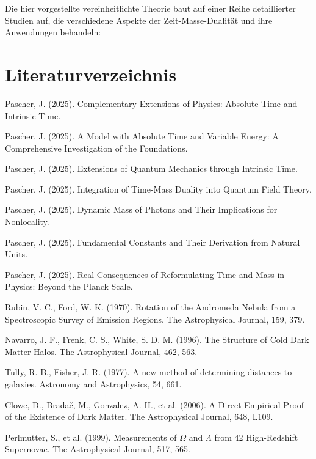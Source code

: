 \documentclass{article}
\begin{document}
	Die hier vorgestellte vereinheitlichte Theorie baut auf einer Reihe detaillierter Studien auf, die verschiedene Aspekte der Zeit-Masse-Dualität und ihre Anwendungen behandeln:
	
	\section{Literaturverzeichnis}
	
	\begin{thebibliography}{99}
		
		 Pascher, J. (2025). Complementary Extensions of Physics: Absolute Time and Intrinsic Time.
		
		 Pascher, J. (2025). A Model with Absolute Time and Variable Energy: A Comprehensive Investigation of the Foundations.
		
		 Pascher, J. (2025). Extensions of Quantum Mechanics through Intrinsic Time.
		
		 Pascher, J. (2025). Integration of Time-Mass Duality into Quantum Field Theory.
		
		 Pascher, J. (2025). Dynamic Mass of Photons and Their Implications for Nonlocality.
		
		 Pascher, J. (2025). Fundamental Constants and Their Derivation from Natural Units.
		
		 Pascher, J. (2025). Real Consequences of Reformulating Time and Mass in Physics: Beyond the Planck Scale.
		
		 Rubin, V. C., Ford, W. K. (1970). Rotation of the Andromeda Nebula from a Spectroscopic Survey of Emission Regions. The Astrophysical Journal, 159, 379.
		
		 Navarro, J. F., Frenk, C. S., White, S. D. M. (1996). The Structure of Cold Dark Matter Halos. The Astrophysical Journal, 462, 563.
		
		 Tully, R. B., Fisher, J. R. (1977). A new method of determining distances to galaxies. Astronomy and Astrophysics, 54, 661.
		
		 Clowe, D., Bradač, M., Gonzalez, A. H., et al. (2006). A Direct Empirical Proof of the Existence of Dark Matter. The Astrophysical Journal, 648, L109.
		
		 Perlmutter, S., et al. (1999). Measurements of $\Omega$ and $\Lambda$ from 42 High-Redshift Supernovae. The Astrophysical Journal, 517, 565.
		

\end{thebibliography}
\end{document}
